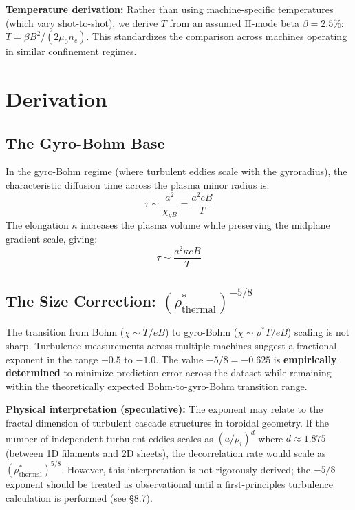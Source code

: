 \documentclass[11pt,letterpaper]{article}
\newcommand{\chiGB}{\chi_{gB}}
\newcommand{\rhostar}{\rho^*}
\newcommand{\rhotherm}{\rho_{\text{thermal}}^*}
\begin{document}
\textbf{Temperature derivation:} Rather than using machine-specific temperatures (which vary shot-to-shot), we derive $T$ from an assumed H-mode beta $\beta = 2.5\%$: $T = \beta B^2 / (2\mu_0 n_e)$. This standardizes the comparison across machines operating in similar confinement regimes.

\section{Derivation}

\subsection{The Gyro-Bohm Base}

In the gyro-Bohm regime (where turbulent eddies scale with the gyroradius), the characteristic diffusion time across the plasma minor radius is:
\begin{equation}
\tau \sim \frac{a^2}{\chiGB} = \frac{a^2 eB}{T}
\end{equation}
The elongation $\kappa$ increases the plasma volume while preserving the midplane gradient scale, giving:
\begin{equation}
\tau \sim \frac{a^2 \kappa eB}{T}
\end{equation}

\subsection{The Size Correction: $(\rhotherm)^{-5/8}$}

The transition from Bohm ($\chi \sim T/eB$) to gyro-Bohm ($\chi \sim \rhostar T/eB$) scaling is not sharp. Turbulence measurements across multiple machines suggest a fractional exponent in the range $-0.5$ to $-1.0$. The value $-5/8 = -0.625$ is \textbf{empirically determined} to minimize prediction error across the dataset while remaining within the theoretically expected Bohm-to-gyro-Bohm transition range.

\textbf{Physical interpretation (speculative):} The exponent may relate to the fractal dimension of turbulent cascade structures in toroidal geometry. If the number of independent turbulent eddies scales as $(a/\rho_i)^d$ where $d \approx 1.875$ (between 1D filaments and 2D sheets), the decorrelation rate would scale as $(\rhotherm)^{5/8}$. However, this interpretation is not rigorously derived; the $-5/8$ exponent should be treated as observational until a first-principles turbulence calculation is performed (see \S8.7).
\end{document}
